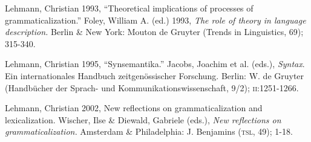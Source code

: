 Lehmann, Christian 1993, “Theoretical implications of processes of grammaticalization.” Foley, William A. (ed.) 1993, \textit{The role of theory in language description.} Berlin \& New York: Mouton de Gruyter (Trends in Linguistics, 69); 315-340.

Lehmann, Christian 1995, “Synsemantika.” Jacobs, Joachim et al. (eds.), \textit{Syntax}. Ein internationales Handbuch zeitgenössischer Forschung. Berlin: W. de Gruyter (Handbücher der Sprach- und Kommunikationswissenschaft, 9/2); \textsc{ii}:1251-1266.

Lehmann, Christian 2002, {\textquotedbl}New reflections on grammaticalization and lexicalization.{\textquotedbl} Wischer, Ilse \& Diewald, Gabriele (eds.), \textit{New reflections on grammaticalization.} Amsterdam \& Philadelphia: J. Benjamins (\textsc{tsl}, 49); 1-18.